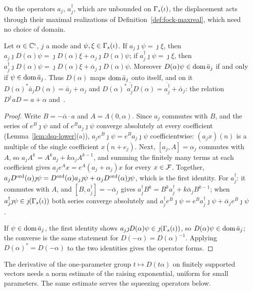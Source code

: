 \begin{veteenv}
On the operators $a_j$, $a_j^\dagger$, which are unbounded on $\Gamma_s(\iota)$, the displacement acts through their maximal
realizations of Definition~\ref{def:fock-maxreal}, which need no choice of domain.

\begin{theorem}\label{thm:dsq-disp-intertwine}
Let $\alpha\in\mathbb C^\iota$, $j$ a mode and $\psi,\xi\in\Gamma_s(\iota)$. If $a_j\jmath\psi=\jmath\xi$, then $a_j\jmath D(\alpha)\psi=\jmath D(\alpha)\xi
+\alpha_j\jmath D(\alpha)\psi$; if $a_j^\dagger\jmath\psi=\jmath\xi$, then $a_j^\dagger\jmath D(\alpha)\psi=\jmath D(\alpha)\xi+\bar\alpha_j\jmath
D(\alpha)\psi$. Moreover $D(\alpha)\psi\in\operatorname{dom}\bar a_j$ if and only if $\psi\in\operatorname{dom}\bar a_j$. Thus $D(\alpha)$ maps $\operatorname{dom}\bar a_j$
onto itself, and on it $D(\alpha)^*\bar a_jD(\alpha)=\bar a_j+\alpha_j$ and $D(\alpha)^*\overline{a_j^\dagger}D(\alpha)=
\overline{a_j^\dagger}+\bar\alpha_j$: the relation $D^\dagger aD=a+\alpha$ and~\cite[(A31)]{tjoacirac}.
\end{theorem}

\begin{proof}
Write $B=-\bar\alpha\cdot a$ and $A=\Lambda(0,\alpha)$. Since $a_j$ commutes with $B$, and the series of $e^B\jmath\psi$ and of
$e^Ba_j\jmath\psi$ converge absolutely at every coefficient (Lemma~\ref{lem:dsq-lower}(a)), $a_je^B\jmath\psi=e^Ba_j\jmath\psi$
coefficientwise: $(a_jx)(n)$ is a multiple of the single coefficient $x(n+e_j)$. Next, $[a_j,A]=\alpha_j$ commutes with $A$, so
$a_jA^k=A^ka_j+k\alpha_jA^{k-1}$, and summing the finitely many terms at each coefficient gives $a_je^Ax=e^A(a_j+\alpha_j)x$ for
every $x\in\mathcal F$. Together, $a_jD^{\mathrm{ord}}(\alpha)\jmath\psi=D^{\mathrm{ord}}(\alpha)a_j\jmath\psi+\alpha_jD^{\mathrm{ord}}(\alpha)\jmath\psi$, which is the
first identity. For $a_j^\dagger$: it commutes with $A$, and $[B,a_j^\dagger]=-\bar\alpha_j$ gives $a_j^\dagger B^k=B^ka_j^\dagger+
k\bar\alpha_jB^{k-1}$; when $a_j^\dagger\jmath\psi\in\jmath(\Gamma_s(\iota))$ both series converge absolutely and $a_j^\dagger e^B\jmath\psi=
e^Ba_j^\dagger\jmath\psi+\bar\alpha_je^B\jmath\psi$.

If $\psi\in\operatorname{dom}\bar a_j$, the first identity shows $a_j\jmath D(\alpha)\psi\in\jmath(\Gamma_s(\iota))$, so $D(\alpha)\psi\in\operatorname{dom}\bar a_j$; the
converse is the same statement for $D(-\alpha)=D(\alpha)^{-1}$. Applying $D(\alpha)^*=D(-\alpha)$ to the two identities gives the
operator forms.
\end{proof}

The derivative of the one-parameter group $t\mapsto D(t\alpha)$ on finitely supported vectors needs a norm estimate of
the raising exponential, uniform for small parameters. The same estimate serves the squeezing operators below.


\end{veteenv}

